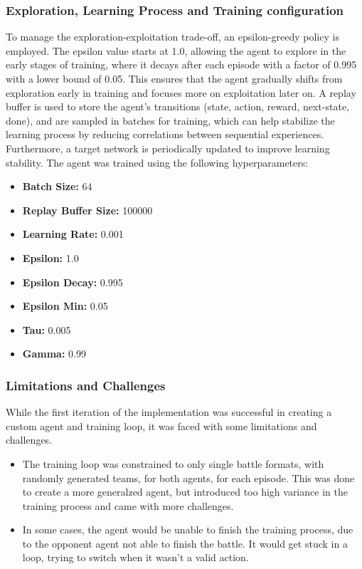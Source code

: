 \subsubsection{Exploration, Learning Process and Training configuration}
To manage the exploration-exploitation trade-off, an epsilon-greedy policy is employed.
The epsilon value starts at 1.0, allowing the agent to explore in the early stages of training,
where it decays after each episode with a factor of 0.995 with a lower bound of 0.05.
This ensures that the agent gradually shifts from exploration early in training
and focuses more on exploitation later on.
A replay buffer is used to store the agent's transitions (state, action, reward, next-state, done), 
and are sampled in batches for training, which can help stabilize the learning process 
by reducing correlations between sequential experiences. Furthermore, a target 
network is periodically updated to improve learning stability.
The agent was trained using the following hyperparameters:
\begin{itemize}
    \item \textbf{Batch Size:} 64
    \item \textbf{Replay Buffer Size:} 100000
    \item \textbf{Learning Rate:} 0.001 
    \item \textbf{Epsilon:} 1.0
    \item \textbf{Epsilon Decay:} 0.995
    \item \textbf{Epsilon Min:} 0.05
    \item \textbf{Tau:} 0.005
    \item \textbf{Gamma:} 0.99
\end{itemize}

\subsubsection{Limitations and Challenges}
While the first iteration of the implementation was successful in creating a custom agent
and training loop, it was faced with some limitations and challenges.
\begin{itemize}
    \item The training loop was constrained to only single battle formats, with
    randomly generated teams, for both agents, for each episode. This was done to create a
    more generalzed agent, but introduced too high variance in the training process and came with more challenges.
    \item In some cases, the agent would be unable to finish the training process, due to the 
    opponent agent not able to finish the battle. It would get stuck in a loop, trying to switch when it
    wasn't a valid action.
\end{itemize}